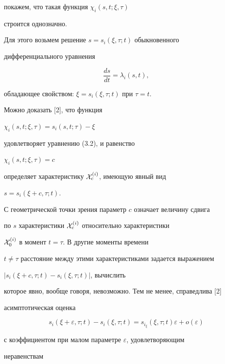 покажем, что такая функция $\chi_{i}(s,t;\xi,\tau)$


строится однозначно.


Для этого возьмем решение $s = s_{i}(\xi, \tau; t)$ обыкновенного


дифференциального уравнения


$$


\frac{ds}{dt} = \lambda_{i}(s,t),


$$


обладающее свойством: $\xi = s_{i}(\xi, \tau; t)$ при $\tau = t$.


Можно доказать [2], что функция


$\chi_{i}(s,t; \xi, \tau) = s_{i}(s,t; \tau) - \xi$


удовлетворяет уравнению (3.2), и равенство


$\chi_{i}(s,t; \xi, \tau) = c$


определяет характеристику ${\cal X}_{c}^{(i)}$, имеющую явный вид


$s = s_{i}(\xi + c, \tau; t)$.





С геометрической точки зрения параметр $c$ означает величину сдвига


по $s$ характеристики ${\cal X}^{(i)}_{c}$ относительно характеристики


${\cal X}^{(i)}_{0}$ в момент $t = \tau$. В другие моменты времени


$t \neq \tau$ расстояние между этими характеристиками задается выражением 


$|s_{i}(\xi + c, \tau; t) - s_{i}(\xi, \tau; t)|$, вычислить


которое явно, вообще говоря, невозможно. Тем не менее, справедлива [2]


асимптотическая оценка


\begin{equation}


s_{i}(\xi + \varepsilon, \tau; t) - s_{i}(\xi, \tau; t) =


s_{i_\xi} (\xi, \tau; t) \varepsilon + o(\varepsilon)


\end{equation}


с коэффициентом при малом параметре $\varepsilon$, удовлетворяющим


неравенствам


